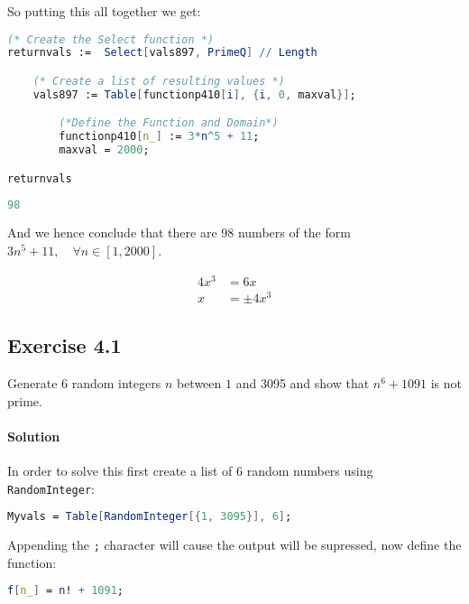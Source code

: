 \documentclass[12pt]{article}
\begin{document}
So putting this all together we get:

\begin{lstlisting}[language = Mathematica]
(* Create the Select function *)
returnvals :=  Select[vals897, PrimeQ] // Length

    (* Create a list of resulting values *)
    vals897 := Table[functionp410[i], {i, 0, maxval}];

        (*Define the Function and Domain*)
        functionp410[n_] := 3*n^5 + 11;
        maxval = 2000;

returnvals
\end{lstlisting}	

\begin{lstlisting}[language = Mathematica]
98
\end{lstlisting}	

And we hence conclude that there are 98 numbers of the form $3n^5+11, \quad \forall n \in \left[ 1, 2000 \right]$.




\begin{align*}
  4x^3&=6x\\
x&=\pm4x^3 
\end{align*}
\subsection{Exercise 4.1}	
Generate 6 random integers $n$ between $1$ and 3095 and show that $n^6 +  1091$ is not prime.

\paragraph{Solution}
In order to solve this first create a list of 6 random numbers using \verb|RandomInteger|:

\begin{lstlisting}[language = Mathematica]
Myvals = Table[RandomInteger[{1, 3095}], 6];
\end{lstlisting}	


Appending the \verb|;| character will cause the output will be supressed, now define the function:

\begin{lstlisting}[language = Mathematica]
f[n_] = n! + 1091;
\end{lstlisting}	
\end{document}
